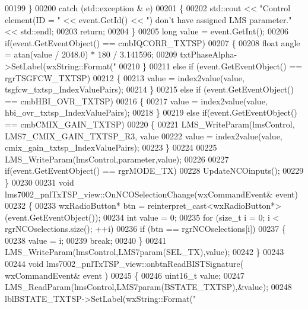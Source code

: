 \begin{DoxyCode}
{{00199     \}
00200     \textcolor{keywordflow}{catch} (std::exception & e)
00201     \{
00202         std::cout << \textcolor{stringliteral}{"Control element(ID = "} << \textcolor{keyword}{event}.GetId() << \textcolor{stringliteral}{") don't have assigned LMS parameter."} << 
      std::endl;
00203         \textcolor{keywordflow}{return};
00204     \}
00205     \textcolor{keywordtype}{long} value = \textcolor{keyword}{event}.GetInt();
00206     \textcolor{keywordflow}{if}(event.GetEventObject() == cmbIQCORR_TXTSP)
00207     \{
00208         \textcolor{keywordtype}{float} angle = atan(value / 2048.0) * 180 / 3.141596;
00209         txtPhaseAlpha->SetLabel(wxString::Format(\textcolor{stringliteral}{"%
00210     \}
00211     \textcolor{keywordflow}{else} \textcolor{keywordflow}{if} (event.GetEventObject() == rgrTSGFCW_TXTSP)
00212     \{
00213         value = index2value(value, tsgfcw_txtsp_IndexValuePairs);
00214     \}
00215     \textcolor{keywordflow}{else} \textcolor{keywordflow}{if} (event.GetEventObject() == cmbHBI_OVR_TXTSP)
00216     \{
00217         value = index2value(value, hbi_ovr_txtsp_IndexValuePairs);
00218     \}
00219     \textcolor{keywordflow}{else} \textcolor{keywordflow}{if}(event.GetEventObject() == cmbCMIX_GAIN_TXTSP)
00220     \{
00221         LMS_WriteParam(lmsControl, LMS7_CMIX_GAIN_TXTSP_R3, value %
00222         value = index2value(value, cmix_gain_txtsp_IndexValuePairs);
00223     \}
00224 
00225     LMS_WriteParam(lmsControl,parameter,value);
00226 
00227     \textcolor{keywordflow}{if}(event.GetEventObject() == rgrMODE_TX)
00228         UpdateNCOinputs();
00229 \}
00230 
00231 \textcolor{keywordtype}{void} lms7002_pnlTxTSP_view::OnNCOSelectionChange(wxCommandEvent& event)
00232 \{
00233     wxRadioButton* btn = \textcolor{keyword}{reinterpret\_cast<}wxRadioButton*\textcolor{keyword}{>}(\textcolor{keyword}{event}.GetEventObject());
00234     \textcolor{keywordtype}{int} value = 0;
00235     \textcolor{keywordflow}{for} (\textcolor{keywordtype}{size\_t} i = 0; i < rgrNCOselections.size(); ++i)
00236         \textcolor{keywordflow}{if} (btn == rgrNCOselections[i])
00237         \{
00238             value = i;
00239             \textcolor{keywordflow}{break};
00240         \}
00241     LMS_WriteParam(lmsControl,LMS7param(SEL_TX),value);
00242 \}
00243 
00244 \textcolor{keywordtype}{void} lms7002_pnlTxTSP_view::onbtnReadBISTSignature( wxCommandEvent& event )
00245 \{
00246     uint16\_t value;
00247     LMS_ReadParam(lmsControl,LMS7param(BSTATE_TXTSP),&value);
00248     lblBSTATE_TXTSP->SetLabel(wxString::Format(\textcolor{stringliteral}{"%
}}}}
\end{DoxyCode}
